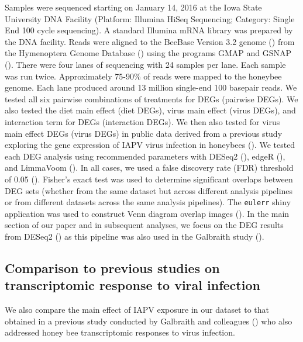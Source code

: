 \documentclass[11pt,a4paper,oldfontcommands,openany]{memoir}
\numberwithin{equation}{section} %
\newcommand{\pkg}[1]{{\texttt{#1}}}
\begin{document}
Samples were sequenced starting on January 14, 2016 at the Iowa State University DNA Facility (Platform: Illumina HiSeq Sequencing; Category: Single End 100 cycle sequencing). A standard Illumina mRNA library was prepared by the DNA facility. Reads were aligned to the BeeBase Version 3.2 genome (\citealt{hbGenome}) from the Hymenoptera Genome Database (\citealt{hymenopteraDB}) using the programs GMAP and GSNAP (\citealt{gsnap}). There were four lanes of sequencing with 24 samples per lane. Each sample was run twice. Approximately 75-90\% of reads were mapped to the honeybee genome. Each lane produced around 13 million single-end 100 basepair reads. We tested all six pairwise combinations of treatments for DEGs (pairwise DEGs). We also tested the diet main effect (diet DEGs), virus main effect (virus DEGs), and interaction term for DEGs (interaction DEGs). We then also tested for virus main effect DEGs (virus DEGs) in public data derived from a previous study exploring the gene expression of IAPV virus infection in honeybees (\citealt{galbraith}). We tested each DEG analysis using recommended parameters with DESeq2 (\citealt{deseq2}), edgeR (\citealt{edger}), and LimmaVoom (\citealt{limma}). In all cases, we used a false discovery rate (FDR) threshold of 0.05 (\citealt{benjamini}). Fisher's exact test was used to determine significant overlaps between DEG sets (whether from the same dataset but across different analysis pipelines or from different datasets across the same analysis pipelines). The \pkg{eulerr} shiny application was used to construct Venn diagram overlap images (\citealt{euler}). In the main section of our paper and in subsequent analyses, we focus on the DEG results from DESeq2 (\citealt{deseq2}) as this pipeline was also used in the Galbraith study (\citealt{galbraith}).




\subsection{Comparison to previous studies on transcriptomic response to viral infection}

We also compare the main effect of IAPV exposure in our dataset to that obtained in a previous study conducted by Galbraith and colleagues (\citealt{galbraith}) who also addressed honey bee transcriptomic responses to virus infection.
\end{document}
